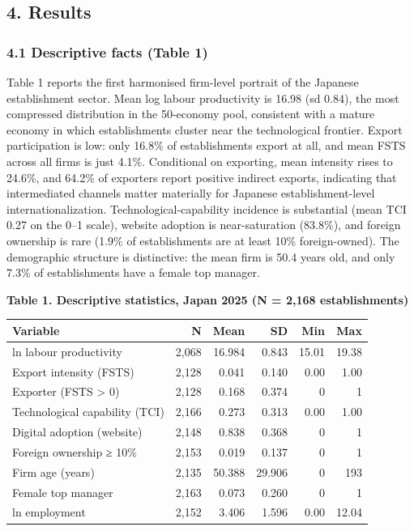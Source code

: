 \documentclass[
  12pt,a4paper]{article}
\begin{document}
\hypertarget{results}{%
\subsection{4. Results}\label{results}}

\hypertarget{descriptive-facts-table-1}{%
\subsubsection{4.1 Descriptive facts (Table
1)}\label{descriptive-facts-table-1}}

Table 1 reports the first harmonised firm-level portrait of the Japanese
establishment sector. Mean log labour productivity is 16.98 (sd 0.84),
the most compressed distribution in the 50-economy pool, consistent with
a mature economy in which establishments cluster near the technological
frontier. Export participation is low: only 16.8\% of establishments
export at all, and mean FSTS across all firms is just 4.1\%. Conditional
on exporting, mean intensity rises to 24.6\%, and 64.2\% of exporters
report positive indirect exports, indicating that intermediated channels
matter materially for Japanese establishment-level internationalization.
Technological-capability incidence is substantial (mean TCI 0.27 on the
0--1 scale), website adoption is near-saturation (83.8\%), and foreign
ownership is rare (1.9\% of establishments are at least 10\%
foreign-owned). The demographic structure is distinctive: the mean firm
is 50.4 years old, and only 7.3\% of establishments have a female top
manager.

\textbf{Table 1. Descriptive statistics, Japan 2025 (N = 2,168
establishments)}

\begin{longtable}[]{@{}lrrrrr@{}}
\toprule\noalign{}
Variable & N & Mean & SD & Min & Max \\
\midrule\noalign{}
\endhead
\bottomrule\noalign{}
\endlastfoot
ln labour productivity & 2,068 & 16.984 & 0.843 & 15.01 & 19.38 \\
Export intensity (FSTS) & 2,128 & 0.041 & 0.140 & 0.00 & 1.00 \\
Exporter (FSTS \textgreater{} 0) & 2,128 & 0.168 & 0.374 & 0 & 1 \\
Technological capability (TCI) & 2,166 & 0.273 & 0.313 & 0.00 & 1.00 \\
Digital adoption (website) & 2,148 & 0.838 & 0.368 & 0 & 1 \\
Foreign ownership ≥ 10\% & 2,153 & 0.019 & 0.137 & 0 & 1 \\
Firm age (years) & 2,135 & 50.388 & 29.906 & 0 & 193 \\
Female top manager & 2,163 & 0.073 & 0.260 & 0 & 1 \\
ln employment & 2,152 & 3.406 & 1.596 & 0.00 & 12.04 \\
\end{longtable}
\end{document}
